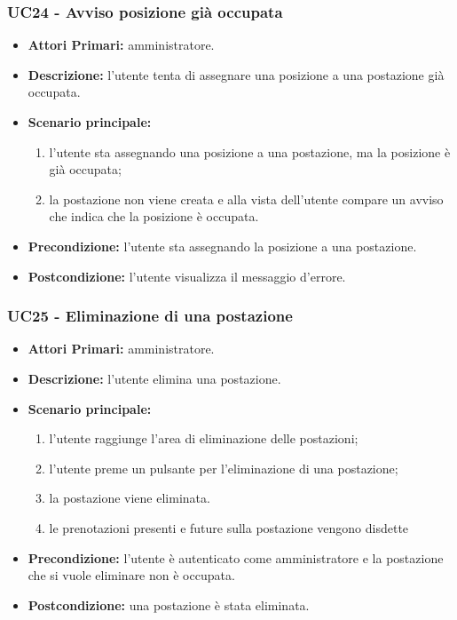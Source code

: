 \subsubsection{UC24 - Avviso posizione già occupata}
\begin{itemize}
	\item\textbf{Attori Primari:}
	amministratore.
	\item\textbf{Descrizione:}
	l'utente tenta di assegnare una posizione a una postazione già occupata.
	\item\textbf{Scenario principale:}
	\begin{enumerate}
		\item l'utente sta assegnando una posizione a una postazione, ma la posizione è già occupata;
		\item la postazione non viene creata e alla vista dell'utente compare un avviso che indica che la posizione è occupata.
	\end{enumerate}
	\item\textbf{Precondizione:}
	l'utente sta assegnando la posizione a una postazione.
	\item\textbf{Postcondizione:}
	l'utente visualizza il messaggio d'errore.
\end{itemize}

\subsubsection{UC25 - Eliminazione di una postazione}
\begin{itemize}
	\item\textbf{Attori Primari:}
	amministratore.
	\item\textbf{Descrizione:}
	l'utente elimina una postazione.
	\item\textbf{Scenario principale:} 
	\begin{enumerate}
		\item l'utente raggiunge l'area di eliminazione delle postazioni;
		\item l'utente preme un pulsante per l'eliminazione di una postazione;
		\item la postazione viene eliminata.
		\item le prenotazioni presenti e future sulla postazione vengono disdette
	\end{enumerate}
	\item\textbf{Precondizione:} 
	l'utente è autenticato come amministratore e la postazione che si vuole eliminare non è occupata.
	\item\textbf{Postcondizione:}
	una postazione è stata eliminata.
\end{itemize}

